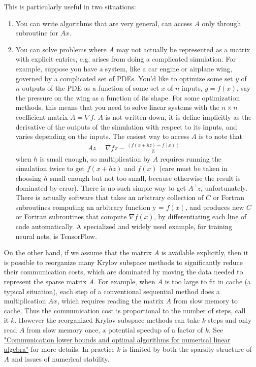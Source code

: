 \documentclass[11pt]{article}
\numberwithin{equation}{section}
\begin{document}
This is particularly useful in two situations:\begin{enumerate}
    \item You can write algorithms that are very general, can access $A$ only through subroutine for $Ax$.
    \item You can solve problems where $A$ may not actually be represented as a matrix with explicit entries, e.g. arises from doing a complicated simulation.
    For example, suppose you have a system, like a car engine or airplane wing, governed by a complicated set of PDEs. 
    You'd like to optimize some set $y$ of $n$ outputs of the PDE as a function of some set $x$ of $n$ inputs, $y=f(x)$, 
    say the pressure on the wing as a function of its shape. For some optimization methods, 
    this means that you need to solve linear systems with the $n\times n$ coefficient matrix $A = \nabla f$.
    $A$ is not written down, it is define implicitly as the derivative of the outputs of the simulation with respect to its inputs, and varies depending on the inputs. 
    The easiest way to access $A$ is to note that \begin{align*}
        Az = \nabla fz \sim \frac{(f(x + hz) - f(x))}{h}
    \end{align*}
    when $h$ is small enough, so multiplication by $A$ requires running the simulation twice to get $f(x + hz)$ and $f(x)$ 
    (care must be taken in choosing $h$ small enough but not too small, because otherwise the result is dominated by error).
    There is no such simple way to get $A^\top z$, unfortunately. There is actually software that takes an arbitrary collection of $C$ or
    Fortran subroutines computing an arbitrary function y = $f(x)$, and produces new $C$ or Fortran subroutines that compute $\nabla f(x)$, by differentiating
    each line of code automatically. A specialized and widely used example, for training neural nets, is TensorFlow.
\end{enumerate}





On the other hand, if we assume that the matrix $A$ is available explicitly, 
then it is possible to reorganize many Krylov subspace methods to significantly reduce their communication costs, 
which are dominated by moving the data needed to represent the sparse matrix $A$. For example, when $A$ is too large to fit in cache (a typical situation), 
each step of a conventional sequential method does a multiplication $Ax$, which requires reading the matrix $A$ from slow memory to cache.
Thus the communication cost is proportional to the number of steps, call it $k$.
However the reorganized Krylov subspace methods can take $k$ steps and only read $A$ from slow memory once, a potential speedup of a factor of $k$.
See \href{http://journals.cambridge.org/action/displayAbstract?fromPage=online&aid=9260756&fileId=S0962492914000038}{"Communication lower bounds and optimal algorithms for numerical linear algebra"} for more details. 
In practice $k$ is limited by both the sparsity structure of $A$ and issues of numerical stability.
\end{document}
